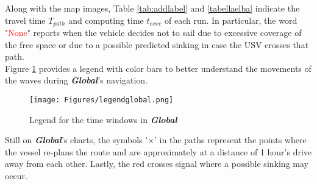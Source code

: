 Along with the map images, Table \ref{tab:addlabel} and \ref{tabellaelba} indicate the travel time $T_{path}$ and computing time $t_{exec}$ of each run. In particular, the word "\textcolor{red}{None}" reports when the vehicle decides not to sail due to excessive coverage of the free space or due to a possible predicted sinking in case the USV crosses that path.\\
Figure \ref{legendglobal} provides a legend with color bars to better understand the movements of the waves during \textbf{\textit{Global}}'s navigation.
\begin{figure}[H]
	\centering
	\texttt{[image: Figures/legendglobal.png]}
	\caption{Legend for the time windows in \textbf{\textit{Global}}}
	\label{legendglobal}
\end{figure} 
Still on \textbf{\textit{Global}}'s charts, the symbols '$\times$' in the paths represent the points where the vessel re-plans the route and are approximately at a distance of 1 hour's drive away from each other. Lastly, the red crosses signal where a possible sinking may occur.

